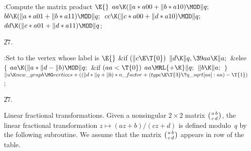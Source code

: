 \B{}:Compute the matrix product %
\X${}\E{}$\6
$\\{aa}\K(\|a*\\{a00}+\|b*\\{a10})\MOD\|q;{}$\6
${}\\{bb}\K(\|a*\\{a01}+\|b*\\{a11})\MOD\|q;{}$\6
${}\\{cc}\K(\|c*\\{a00}+\|d*\\{a10})\MOD\|q;{}$\6
${}\\{dd}\K(\|c*\\{a01}+\|d*\\{a11})\MOD\|q{}$;\par
\U27.\fi

\B{}:Set  to the vertex whose label is \X${}\E{}$\6
\&{if} ${}(\|c\E\T{0}){}$\1\5
${}\|d\K\|q,\39\\{aa}\K\|a;{}$\2\6
\&{else}\5
${}\{{}$\1\6
${}\\{aa}\K(\|a*\|d-\|b)\MOD\|q;{}$\6
\&{if} ${}(\\{aa}<\T{0}){}$\1\5
${}\\{aa}\MRL{+{\K}}\|q;{}$\2\6
${}\|b\K\|a;{}$\6
\4${}\}{}$\2\6
${}\|u\K\\{new\_graph}\MG\\{vertices}+((\|d*\|q+\|b)*\\{n\_factor}+(\\{type}\E%
\T{3}\?\\{q\_sqrt}[\\{aa}]:\\{aa})-\T{1}){}$;\par
\U27.\fi

Linear fractional transformations. Given a nonsingular $2\times2$
matrix
$\bigl({a\,b\atop c\,d}\bigr)$, the linear fractional transformation
$z\mapsto(az+b)/(cz+d)$ is defined modulo~$q$ by the
following subroutine. We assume that the matrix $\bigl({a\,b\atop c\,d}\bigr)$
appears in row  of the  table.

